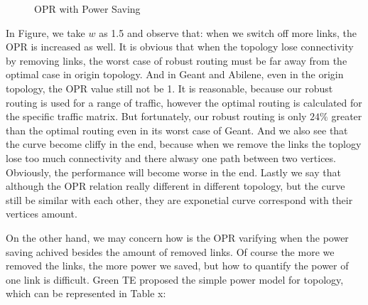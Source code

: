 \documentclass[conference]{IEEEtran}
\begin{document}
\begin{figure}[!t]
\centering
\vspace*{0.1in}
\caption{OPR with Power Saving}
\vspace*{0.1in}
\end{figure}

In Figure, we take $w$ as 1.5 and observe that: when we switch off more links, the OPR is increased as well. 
It is obvious that when the topology
lose connectivity by removing links, the worst case of robust routing must be far away from the optimal case in origin topology. And
in Geant and Abilene, even in the origin topology, the OPR value still not be 1. It is reasonable, because our robust routing 
is used for a range of traffic, however the optimal routing is calculated for the specific traffic matrix. But fortunately, our robust
routing is only $24\%$ greater than the optimal routing even in its worst case of Geant. And we also see that the curve become 
cliffy in the end, because when we remove the links the toplogy lose too much connectivity and there alwasy one path between two vertices.
Obviously, the performance will become worse in the end. Lastly we say that although the OPR relation really different in different 
topology, but the curve still be similar with each other, they are exponetial curve correspond with their vertices amount.


On the other hand, we may concern how is the OPR varifying when the power saving achived besides the amount of removed links.
Of course the more we removed the links, the more power we saved, but how to quantify the power of one link is difficult. Green
TE proposed the simple power model for topology, which can be represented in Table x:
\end{document}
